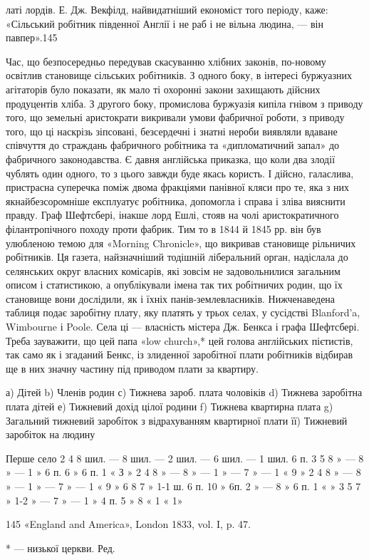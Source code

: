 латі лордів. Е. Дж. Векфілд, найвидатніший економіст того періоду,
каже: «Сільський робітник південної Англії і не раб
і не вільна людина, — він павпер».145

Час, що безпосередньо передував скасуванню хлібних законів,
по-новому освітлив становище сільських робітників. З одного
боку, в інтересі буржуазних агітаторів було показати, як
мало ті охоронні закони захищають дійсних продуцентів хліба.
З другого боку, промислова буржуазія кипіла гнівом з приводу
того, що земельні аристократи викривали умови фабричної роботи,
з приводу того, що ці наскрізь зіпсовані, безсердечні і
знатні нероби виявляли вдаване співчуття до страждань фабричного
робітника та «дипломатичний запал» до фабричного законодавства.
Є давня англійська приказка, що коли два злодії
чублять один одного, то з цього завжди буде якась користь.
І дійсно, галаслива, пристрасна суперечка поміж двома фракціями
панівної кляси про те, яка з них якнайбезсоромніше експлуатує
робітника, допомогла і справа і зліва вияснити правду. Граф
Шефтсбері, інакше лорд Ешлі, стояв на чолі аристократичного
філантропічного походу проти фабрик. Тим то в 1844 й
1845 рр. він був улюбленою темою для «Morning Chronicle», що
викривав становище рільничих робітників. Ця газета, найзначніший
тодішній ліберальний орган, надіслала до селянських округ
власних комісарів, які зовсім не задовольнилися загальним
описом і статистикою, а опублікували імена так тих робітничих
родин, що їх становище вони дослідили, як і їхніх панів-землевласників.
Нижченаведена таблиця подає заробітну плату,
яку платять у трьох селах, у сусідстві Blanford’a, Wimbourne
і Poole. Села ці — власність містера Дж. Бенкса і графа Шефтсбері.
Треба зауважити, що цей папа «low church»,* цей голова англійських
пієтистів, так само як і згаданий Бенкс, із злиденної
заробітної плати робітників відбирав ще в них значну частину
під приводом плати за квартиру.

а) Дітей    b) Членів родин    с) Тижнева зароб. плата чоловіків    d) Тижнева заробітна плата дітей
   е) Тижневий дохід цілої родини    f) Тижнева квартирна плата
g) Загальний тижневий заробіток з відрахуванням квартирної плати    її) Тижневий заробіток на людину

Перше село
2    4    8 шил. —                8 шил. —     2 шил. —       6 шил.   —     1 шил. 6      п.
3    5    8    »     —                 8   »      —     1    »      6 п.   6    »       6 п.  1   « 
    З  »
2    4    8    »     —                 8   »      —     1    »      —      7    »       —      1   «
     9       »
2    4    8    »     —                 8   »      —     1    »      —      7    »       —      1   «
     9       »
6    8    7    »    1-1 ш. 6 п.  10 »      6п.   2    »     —       8    »       6 п.   1  «        
 »
3    5    7    »    1-2  » —       7   »      —     1    »      4 п.   5    »       8 «     1  «    
 1»

145 «England and America», London 1833, vol. I, p. 47.

* — низької церкви. Ред.
